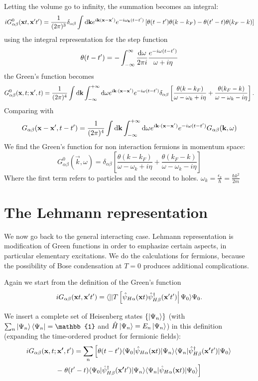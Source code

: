 Letting the volume go to infinity, the summation becomes an integral:
\[ iG^0_{\alpha\beta}(\bm{\mathrm{x}}t, \bm{\mathrm{x}}'t') = \frac{1}{(2\pi)^3}\delta_{\alpha\beta} \int \operatorname{d \!}{\bm{\mathrm{k}}} e^{i \bm{\mathrm{k}}(\bm{\mathrm{x}}- \bm{\mathrm{x}}')}e^{-i\omega_{\bm{\mathrm{k}}}(t-t')} \left[\theta(t-t')\theta(k-k_F) - \theta(t'-t)\theta(k_F-k)\right] \]
using the integral representation for the step function
\[ \theta(t-t') = -\int^\infty_{-\infty} \frac{\operatorname{d \!}{\omega}}{2\pi i}\frac{e^{-i\omega(t-t')}}{\omega + i\eta} \]
the Green's function becomes
\[G^0_{\alpha\beta}(\bm{\mathrm{x}},t;\bm{\mathrm{x}}',t) = \frac{1}{(2\pi)^4} \int \operatorname{d \!}{\bm{\mathrm{k}}}\int^{+\infty}_{-\infty} \operatorname{d \!}{\omega}e^{i \bm{\mathrm{k}}\cdot(\bm{\mathrm{x}}- \bm{\mathrm{x}}')}e^{-i\omega(t-t')}\delta_{\alpha\beta}\left[\frac{\theta(k-k_F)}{\omega - \omega_k + i\eta}+\frac{\theta(k_F-k)}{\omega - \omega_k - i\eta}\right].\]
Comparing with
\[G_{\alpha\beta}(\bm{\mathrm{x}}- \bm{\mathrm{x}}', t-t') = \frac{1}{(2\pi)^4} \int \operatorname{d \!}{\bm{\mathrm{k}}}\int^{+\infty}_{-\infty} \operatorname{d \!}{\omega}e^{i \bm{\mathrm{k}}\cdot(\bm{\mathrm{x}}- \bm{\mathrm{x}}')}e^{-i\omega(t-t')}G_{\alpha\beta}(\bm{\mathrm{k}},\omega)\]
We find the Green's function for non interaction fermions in momentum space:
\[ G_{\alpha\beta}^0(\vec{k},\omega) = \delta_{\alpha\beta}\left[\frac{\theta(k-k_F)}{\omega-\omega_k+i\eta} + \frac{\theta(k_F-k)}{\omega - \omega_k - i\eta}\right] \]
Where the first term refers to particles and the second to holes. $\omega_k = \frac{\epsilon_k}{\hbar} = \frac{\hbar k^2}{2m}$

\section{The Lehmann representation}

We now go back to the general interacting case. Lehmann representation is modification of Green functions in order to emphasize certain aspects, in particular elementary excitations. We do the calculations for fermions, because the possibility of Bose condensation at $T=0$ produces additional complications.

Again we start from the definition of the Green's function
\[ iG_{\alpha\beta}(\vec{x}t, \vec{x}'t') = \braket[T \left[\hat{\psi}_{H\alpha}(\vec{x}t)\hat{\psi}_{H\beta}^\dagger(\vec{x}'t')\right]]{\Psi_0}{\Psi_0}. \]

We insert a complete set of Heisenberg states $\{\left| \Psi_n \right\rangle\}$ (with $\sum_n\ket{\Psi_n}\bra{\Psi_n} = \mathbb{1}$ and $\hat{H}\left| \Psi_n \right\rangle = E_n\left| \Psi_n \right\rangle$) in this definition (expanding the time-ordered product for fermionic fields):
\begin{multline*}
iG_{\alpha\beta}(\vec{x},t;\vec{x'},t') = \sum_n \left[\theta(t-t')\braket[\hat{\psi}_{H\alpha}(\vec{x}t)]{\Psi_0}{\Psi_n}\braket[\hat{\psi}^\dagger_{H\beta}(\vec{x'}t')]{\Psi_n}{\Psi_0}\right. \\
- \left.\theta(t'-t)\braket[\hat{\psi}^\dagger_{H\beta}(\vec{x'}t')]{\Psi_0}{\Psi_n}\braket[\hat{\psi}_{H\alpha}(\vec{x}t)]{\Psi_n}{\Psi_0}\right]
\end{multline*}

